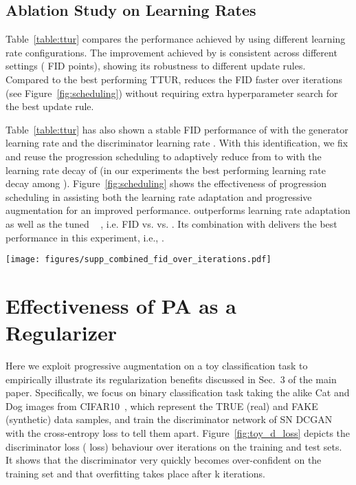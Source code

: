 \documentclass{article}
\begin{document}
\begin{center}
\subsection{Ablation Study on Learning Rates}\label{Ssubsec:ttur}
Table~\ref{table:ttur} compares the performance achieved by using different learning rate configurations. The improvement achieved by  is consistent across different settings ( FID points), showing its robustness to different update rules. Compared to the best performing TTUR,  reduces the FID faster over iterations (see Figure~\ref{fig:scheduling}) without requiring extra hyperparameter search for the best update rule. 

Table~\ref{table:ttur} has also shown a stable FID performance of  with the generator learning rate  and the discriminator learning rate . With this identification, we fix  and reuse the progression scheduling to adaptively reduce  from  to  with the learning rate decay of  (in our experiments the best performing learning rate decay among ). 
Figure~\ref{fig:scheduling} shows the effectiveness of progression scheduling in assisting both the learning rate adaptation and progressive augmentation for an improved performance.  outperforms learning rate adaptation as well as the tuned ~\cite{heuselttur2017} , i.e. FID  vs.  vs. . Its combination with  delivers the best performance in this experiment, i.e., .


\begin{figure*}[t!]
\begin{center}
		\texttt{[image: figures/supp\_combined\_fid\_over\_iterations.pdf]}
	\end{center}
\caption{\label{fig:scheduling}FID learning curves (mean FIDs with one standard deviation across five random runs) of , , adaptive learning rate and  on CIFAR10 with .}
\end{figure*}



\section{Effectiveness of PA as a Regularizer}\label{sup_sec_toy_example}




Here we exploit progressive augmentation on a toy classification task to empirically illustrate its regularization benefits discussed in Sec.~3 of the main paper. Specifically, we focus on binary classification task taking the alike Cat and Dog images from CIFAR10~\cite{Cifar10_Krizhevsky09learningmultiple}, which represent the TRUE (real) and FAKE (synthetic) data samples, and train the discriminator network of SN DCGAN with the cross-entropy loss to tell them apart. Figure~\ref{fig:toy_d_loss} depicts the discriminator loss ( loss) behaviour over iterations on the training and test sets. It shows that the discriminator very quickly becomes over-confident on the training set and that overfitting takes place after \unit{k} iterations.



\end{center}
\end{document}
